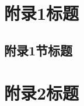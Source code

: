 \begin{appendix}
\appendixpage %

\chapter{附录1标题}
\section{附录1节标题}
\zhlipsum

\chapter{附录2标题}
\zhlipsum

\end{appendix}
